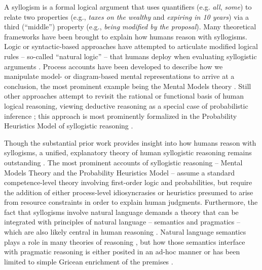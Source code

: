\documentclass[floatsintext, man]{apa6}
\begin{document}
A syllogism is a formal logical argument that uses quantifiers (e.g. \emph{all}, \emph{some}) to relate two properties (e.g., \emph{taxes on the wealthy} and \emph{expiring in 10 years}) via a third (``middle'') property (e.g., \emph{being modified by the proposal}). 
Many theoretical frameworks have been brought to explain how humans reason with syllogisms.
Logic or syntactic-based approaches have attempted to articulate modified logical rules -- so-called ``natural logic'' -- that humans deploy when evaluating syllogistic arguments \cite{braine1983logical, rips1994, geurts2003reasoning}.
Process accounts have been developed to describe how we manipulate  model- or diagram-based mental representations to arrive at a conclusion, the most prominent example being the Mental Models theory \cite{johnson1975models, johnson1983mental, johnson2015logic}.
Still other approaches attempt to revisit the rational or functional basis of human logical reasoning, viewing deductive reasoning as a special case of probabilistic inference \cite{oaksford2001probabilistic, oaksford2007bayesian, hahn2007rationality, tenenbaum2006theory}; this approach is most prominently   formalized in the Probability Heuristics Model of syllogistic reasoning \cite{Chater1999}.



Though the substantial prior work provides insight into how humans reason with syllogisms, a unified, explanatory theory of human syllogistic reasoning remains outstanding \cite{Khemlani2012}. 
The most prominent accounts of syllogistic reasoning -- Mental Models Theory \cite{johnson1975models, johnson2015logic} and the Probability Heuristics Model  \cite{Chater1999} -- assume a standard competence-level theory involving first-order logic and probabilities, but require the addition of either process-level idiosyncrasies or heuristics presumed to arise from resource constraints in order to explain human judgments. 
Furthermore, the fact that syllogisms involve natural language demands a theory that can be integrated with principles of natural language  -- semantics and pragmatics -- which are also likely central in human reasoning \cite{sperber1986relevance,mercier2017enigma}.
Natural language semantics plays a role in many theories of reasoning \cite{JL1978, Khemlani2012, geurts2003reasoning}, but how those semantics interface with pragmatic reasoning is either posited in an ad-hoc manner \cite{Chater1999} or has been limited to simple Gricean enrichment of the premises \cite{Roberts2001}.	
\end{document}
